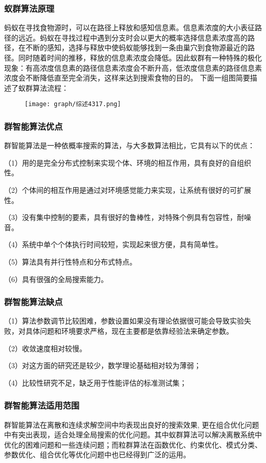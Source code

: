 \documentclass{cjc}
\begin{document}
\subsubsection{蚁群算法原理}
蚂蚁在寻找食物源时，可以在路径上释放和感知信息素。信息素浓度的大小表征路径的远近。蚂蚁在寻找过程中遇到分支时会以更大的概率选择信息素浓度高的路径，在不断的感知，选择与释放中使蚂蚁能够找到一条由巢穴到食物源最近的路径。同时随着时间的推移，释放的信息素浓度会降低。因此蚁群有一种特殊的极化现象：有高浓度信息素的路径信息素浓度会不断升高，低浓度信息素的路径信息素浓度会不断降低直至完全消失，这样来达到搜索食物的目的。
下面一组图简要描述了蚁群算法流程：
\begin{figure}
  \centering
  \texttt{[image: graph/综述4317.png]}
\end{figure}

\subsubsection{群智能算法优点}
群智能算法是一种依概率搜索的算法，与大多数算法相比，它具有以下的优点：

（1）用的是完全分布式控制来实现个体、环境的相互作用，具有良好的自组织性。

（2）个体间的相互作用是通过对环境感觉能力来实现，让系统有很好的可扩展性。

（3）没有集中控制的要素，具有很好的鲁棒性，对特殊个例具有包容性，耐噪音。

（4）系统中单个个体执行时间较短，实现起来很方便，具有简单性。

（5）算法具有并行性特点和分布式特点。

（6）具有很强的全局搜索能力。

\subsubsection{群智能算法缺点}
（1）算法参数调节比较困难，参数设置如果没有理论依据很可能会导致实验失败，对具体问题和环境要求严格，现在主要都是依靠经验法来确定参数。

（2）收敛速度相对较慢。

（3）对这方面的研究还是较少，数学理论基础相对较为薄弱；

（4）比较性研究不足，缺乏用于性能评估的标准测试集；

\subsubsection{群智能算法适用范围}
群智能算法在离散和连续求解空间中均表现出良好的搜索效果, 更在组合优化问题中有突出表现，适合处理全局搜索的优化问题。其中蚁群算法可以解决离散系统中优化的困难问题和一些连续问题；而粒群算法在函数优化、约束优化、模式分类、参数优化、组合优化等优化问题中也已经得到广泛的运用。
\end{document}
